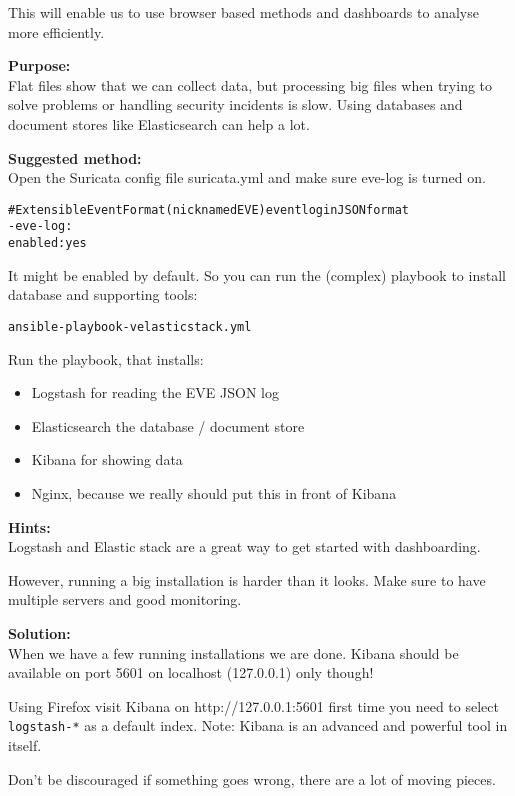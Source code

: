 \documentclass[a4paper,11pt,notitlepage]{report}
\begin{document}
This will enable us to use browser based methods and dashboards to analyse more efficiently.


{\bf Purpose:}\\
Flat files show that we can collect data, but processing big files when trying to solve problems or handling security incidents is slow. Using databases and document stores like Elasticsearch can help a lot.


{\bf Suggested method:}\\
Open the Suricata config file suricata.yml and make sure eve-log is turned on.
\begin{alltt}
# Extensible Event Format (nicknamed EVE) event log in JSON format
- eve-log:
    enabled: yes
\end{alltt}

It might be enabled by default. So you can run the (complex) playbook to install database and supporting tools:
\begin{alltt}
ansible-playbook -v elasticstack.yml
\end{alltt}

Run the playbook, that installs:
\begin{itemize}
\item Logstash for reading the EVE JSON log
\item Elasticsearch the database / document store
\item Kibana for showing data
\item Nginx, because we really should put this in front of Kibana
\end{itemize}


{\bf Hints:}\\
Logstash and Elastic stack are a great way to get started with dashboarding.

However, running a big installation is harder than it looks. Make sure to have multiple servers and good monitoring.

{\bf Solution:}\\
When we have a few running installations we are done. Kibana should be available on port 5601 on localhost (127.0.0.1) only though!

Using Firefox visit Kibana on http://127.0.0.1:5601 first time you need to
 select \verb+logstash-*+ as a default index. Note: Kibana is an advanced and powerful tool in itself.

Don't be discouraged if something goes wrong, there are a lot of moving pieces.
\end{document}
